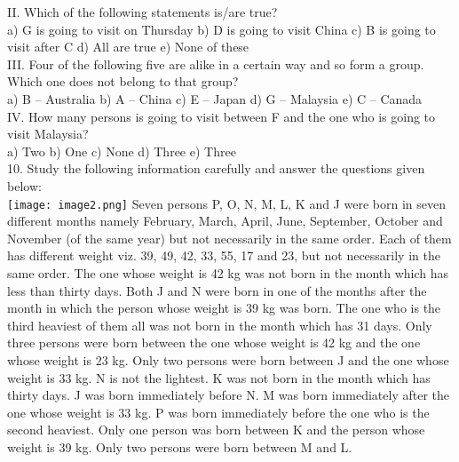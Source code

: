 \documentclass[
]{article}
\begin{document}
II. Which of the following statements is/are true?\\
a) G is going to visit on Thursday \hspace{2mm}b) D is going to visit China
\hspace{2mm}c) B is going to visit after C \hspace{2mm}d) All are true
\hspace{2mm}e) None of these\\

III. Four of the following five are alike in a certain way and so form a group. Which one
does not belong to that group?\\
a) B – Australia \hspace{2mm}b) A – China \hspace{2mm}c) E – Japan
\hspace{2mm}d) G – Malaysia \hspace{2mm}e) C – Canada\\

IV. How many persons is going to visit between F and the one who is going to visit Malaysia?\\
a) Two \hspace{2mm}b) One \hspace{2mm}c) None \hspace{2mm}d) Three \hspace{2mm}e) Three\\

10. Study the following information carefully and answer the questions given below:\\
\texttt{[image: image2.png]}
Seven persons P, O, N, M, L, K and J were born in seven different months namely February,
March, April, June, September, October and November (of the same year) but not
necessarily in the same order. Each of them has different weight viz. 39, 49, 42, 33, 55, 17 and
23, but not necessarily in the same order. The one whose weight is 42 kg was not born in the
month which has less than thirty days. Both J and N were born in one of the months after
the month in which the person whose weight is 39 kg was born. The one who is the third
heaviest of them all was not born in the month which has 31 days. Only three persons were
born between the one whose weight is 42 kg and the one whose weight is 23 kg. Only two
persons were born between J and the one whose weight is 33 kg. N is not the lightest. K was
not born in the month which has thirty days. J was born immediately before N. M was born
immediately after the one whose weight is 33 kg. P was born immediately before the one
who is the second heaviest. Only one person was born between K and the person whose
weight is 39 kg. Only two persons were born between M and L.\\
\end{document}
